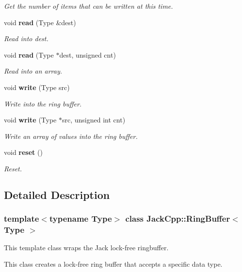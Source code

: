 \begin{CompactItemize}
\begin{CompactList}\small\item\em Get the number of items that can be written at this time. \item\end{CompactList}\item 
void {\bf read} (Type \&dest)
\begin{CompactList}\small\item\em Read into dest. \item\end{CompactList}\item 
void {\bf read} (Type $\ast$dest, unsigned cnt)
\begin{CompactList}\small\item\em Read into an array. \item\end{CompactList}\item 
void {\bf write} (Type src)
\begin{CompactList}\small\item\em Write into the ring buffer. \item\end{CompactList}\item 
void {\bf write} (Type $\ast$src, unsigned int cnt)
\begin{CompactList}\small\item\em Write an array of values into the ring buffer. \item\end{CompactList}\item 
void {\bf reset} ()
\begin{CompactList}\small\item\em Reset. \item\end{CompactList}\end{CompactItemize}


\subsection{Detailed Description}
\subsubsection*{template$<$typename Type$>$ class JackCpp::RingBuffer$<$ Type $>$}

This template class wraps the Jack lock-free ringbuffer. 

This class creates a lock-free ring buffer that accepts a specific data type.

